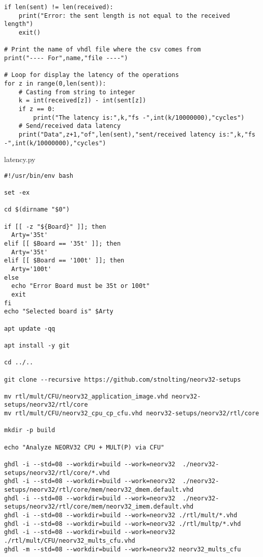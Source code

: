 \begin{code}
\begin{verbatim}
if len(sent) != len(received):
    print("Error: the sent length is not equal to the received length")
    exit()

# Print the name of vhdl file where the csv comes from
print("---- For",name,"file ----")

# Loop for display the latency of the operations
for z in range(0,len(sent)):
    # Casting from string to integer
    k = int(received[z]) - int(sent[z])
    if z == 0:
        print("The latency is:",k,"fs -",int(k/10000000),"cycles")
    # Send/received data latency
    print("Data",z+1,"of",len(sent),"sent/received latency is:",k,"fs -",int(k/10000000),"cycles")
\end{verbatim}
\caption{latency.py}
\label{ap-cod:22}
\end{code}

\begin{code}
\begin{verbatim}
#!/usr/bin/env bash

set -ex

cd $(dirname "$0")

if [[ -z "${Board}" ]]; then
  Arty='35t'
elif [[ $Board == '35t' ]]; then
  Arty='35t'
elif [[ $Board == '100t' ]]; then
  Arty='100t'
else
  echo "Error Board must be 35t or 100t"
  exit
fi
echo "Selected board is" $Arty

apt update -qq

apt install -y git

cd ../..

git clone --recursive https://github.com/stnolting/neorv32-setups

mv rtl/mult/CFU/neorv32_application_image.vhd neorv32-setups/neorv32/rtl/core
mv rtl/mult/CFU/neorv32_cpu_cp_cfu.vhd neorv32-setups/neorv32/rtl/core

mkdir -p build

echo "Analyze NEORV32 CPU + MULT(P) via CFU"

ghdl -i --std=08 --workdir=build --work=neorv32  ./neorv32-setups/neorv32/rtl/core/*.vhd
ghdl -i --std=08 --workdir=build --work=neorv32  ./neorv32-setups/neorv32/rtl/core/mem/neorv32_dmem.default.vhd
ghdl -i --std=08 --workdir=build --work=neorv32  ./neorv32-setups/neorv32/rtl/core/mem/neorv32_imem.default.vhd
ghdl -i --std=08 --workdir=build --work=neorv32 ./rtl/mult/*.vhd
ghdl -i --std=08 --workdir=build --work=neorv32 ./rtl/multp/*.vhd
ghdl -i --std=08 --workdir=build --work=neorv32 ./rtl/mult/CFU/neorv32_mults_cfu.vhd
ghdl -m --std=08 --workdir=build --work=neorv32 neorv32_mults_cfu


\end{verbatim}
\end{code}
